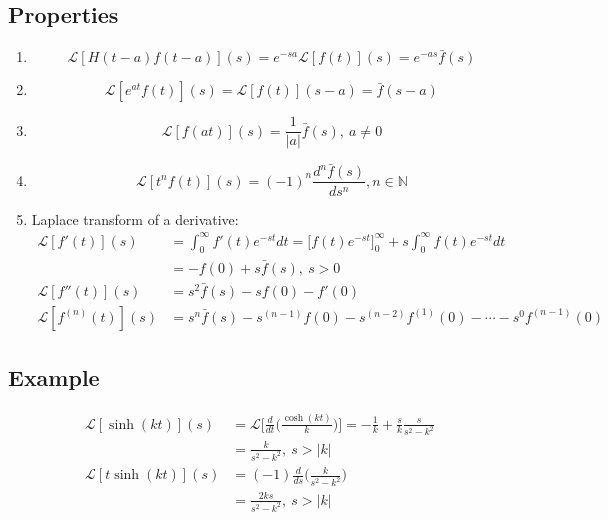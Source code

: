 \documentclass[a4paper, 11pt, normalem]{report}
\newcommand\ofnt{\int_{0}^{\infty}}
\newcommand\La{\mathcal{L}}
\begin{document}
\subsection{Properties}
\begin{enumerate}
    \item   \begin{equation*}
                \La[H(t - a)f(t - a)](s) = e^{-sa}\La[f(t)](s) = e^{-as}\bar{f}(s)
            \end{equation*}
    \item   \begin{equation*}
                \La[e^{at}f(t)](s) = \La[f(t)](s - a) = \bar{f}(s - a)
            \end{equation*}
    \item   \begin{equation*}
                \La[f(at)](s) = \frac{1}{|a|} \bar{f}(s),~ a \neq 0
            \end{equation*}
    \item   \begin{equation*}
                \La[t^n f(t)](s) = (-1)^n \frac{d^n \bar{f}(s)}{ds^n}, n \in \mathbb{N}
            \end{equation*}
    \item Laplace transform of a derivative:
            \begin{align*}
                \La[f'(t)](s) &= \ofnt f'(t)e^{-st}dt = \Big[f(t)e^{-st}\Big]_{0}^{\infty} + s \ofnt f(t)e^{-st}dt \\
                &= -f(0) + s\bar{f}(s),~ s > 0 \\
                \La[f''(t)](s) &= s^2\bar{f}(s) - sf(0) - f'(0) \\
                \La[f^{(n)}(t)](s) &= s^n \bar{f}(s) - s^{(n - 1)}f(0) - s^{(n - 2)}f^{(1)}(0) - \cdots - s^0 f^{(n - 1)}(0)
            \end{align*}
\end{enumerate}

\subsection{Example}
\begin{align*}
    \La[\sinh(kt)](s) &= \La\bigg[\frac{d}{dt}\Big(\frac{\cosh(kt)}{k}\Big)\bigg] = -\frac{1}{k} + \frac{s}{k} \frac{s}{s^2 - k^2} \\
    &= \frac{k}{s^2 - k^2},~ s > |k| \\
    \La[t\sinh(kt)](s) &= (-1)\frac{d}{ds}\Big(\frac{k}{s^2 - k^2}\Big) \\
    &= \frac{2ks}{s^2 - k^2},~ s > |k|
\end{align*}
\end{document}
